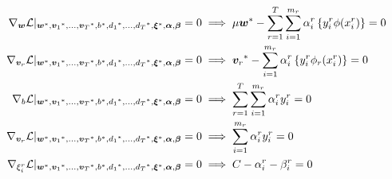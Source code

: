 \begin{align}
    \grad_{\fv{w}} \lagr \vert_{\optim{\fv{w}}, \optim{\fv{v}_1}, \ldots, \optim{\fv{v}_\ntasks}, \optim{b}, \optim{d_1}, \ldots, \optim{d_\ntasks}, \optim{\fv{\xi}}, {\fv{\alpha}}, {\fv{\beta}}} = 0  &\implies \mu \optim{\fv{w}} - \sum_{r= 1}^T \sum_{i=1}^{m_r} {\alpha_i^r} \left\lbrace y_i^r \phi(x_i^r) \right\rbrace = 0 \label{eq:common_repr_add} \\
    \grad_{\fv{v}_r} \lagr \vert_{\optim{\fv{w}}, \optim{\fv{v}_1}, \ldots, \optim{\fv{v}_\ntasks}, \optim{b}, \optim{d_1}, \ldots, \optim{d_\ntasks}, \optim{\fv{\xi}}, {\fv{\alpha}}, {\fv{\beta}}} = 0 &\implies \optim{\fv{v}_r} - \sum_{i=1}^{m_r} {\alpha_i^r} \left\lbrace y_i^r \phi_r(x_i^r) \right\rbrace = 0 \label{eq:specific_repr_add} \\
    \grad_{b} \lagr \vert_{\optim{\fv{w}}, \optim{\fv{v}_1}, \ldots, \optim{\fv{v}_\ntasks}, \optim{b}, \optim{d_1}, \ldots, \optim{d_\ntasks}, \optim{\fv{\xi}}, {\fv{\alpha}}, {\fv{\beta}}} = 0  &\implies \sum_{r= 1}^T \sum_{i=1}^{m_r} {\alpha_i^r} y_i^r = 0 \label{eq:specific_eqconstr_add}  \\
    \grad_{\fv{v}_r} \lagr \vert_{\optim{\fv{w}}, \optim{\fv{v}_1}, \ldots, \optim{\fv{v}_\ntasks}, \optim{b}, \optim{d_1}, \ldots, \optim{d_\ntasks}, \optim{\fv{\xi}}, {\fv{\alpha}}, {\fv{\beta}}} = 0 &\implies \sum_{i=1}^{m_r} {\alpha_i^r} y_i^r = 0 \label{eq:common_eqconstr_add} \\
    \grad_{\xi_i^r} \lagr \vert_{\optim{\fv{w}}, \optim{\fv{v}_1}, \ldots, \optim{\fv{v}_\ntasks}, \optim{b}, \optim{d_1}, \ldots, \optim{d_\ntasks}, \optim{\fv{\xi}}, {\fv{\alpha}}, {\fv{\beta}}} = 0 &\implies C - {\alpha_i^r} - {\beta_i^r} = 0 \label{eq:alpha_feas_add}
\end{align}

